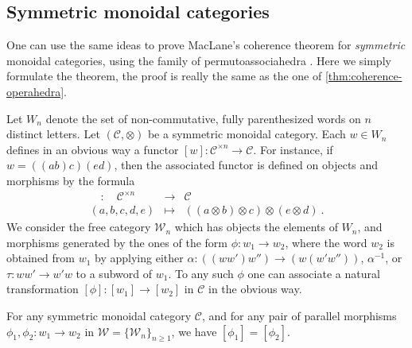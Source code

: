 


\subsection{Symmetric monoidal categories} 
One can use the same ideas to prove MacLane's coherence theorem for \emph{symmetric} monoidal categories, using the family of permutoassociahedra \cite{kapranov1993,reinerCoxeterassociahedra1994,baralicSimplePermutoassociahedron2019,CastilloLiu21}. 
Here we simply formulate the theorem, the proof is really the same as the one of \cref{thm:coherence-operahedra}.

Let $W_n$ denote the set of non-commutative, fully parenthesized words on $n$ distinct letters. 
Let $(\mathcal{C}, \otimes)$ be a symmetric monoidal category.
Each $w \in W_n$ defines in an obvious way a functor $[w] : \mathcal{C}^{\times n} \to \mathcal{C}$.
For instance, if $w=((ab)c)(ed)$, then the associated functor is defined on objects and morphisms by the formula
\begin{eqnarray*}
    [w] \quad : \quad \mathcal{C}^{\times n} & \to & \mathcal{C} \\
    (a,b,c,d,e) & \mapsto & ((a \otimes b) \otimes c)\otimes (e \otimes d) \ .
\end{eqnarray*}
We consider the free category $\mathcal{W}_n$ which has objects the elements of $W_n$, and morphisms generated by the ones of the form $\phi : w_1 \to w_2$, where the word $w_2$ is obtained from $w_1$ by applying either $\alpha : ((ww')w'') \to (w(w'w''))$, $\alpha^{-1}$, or $\tau : ww' \to w'w$ to a subword of $w_1$.
To any such $\phi$ one can associate a natural transformation $[\phi] : [w_1] \to [w_2]$ in $\mathcal{C}$ in the obvious way. 

\begin{thm}
    \label{thm:MacLanesym}
    For any symmetric monoidal category $\mathcal{C}$, and for any pair of parallel morphisms $\phi_1,\phi_2: w_1 \to w_2$ in $\mathcal{W}=\{\mathcal{W}_n\}_{n\geq 1}$, we have $[\phi_1]=[\phi_2]$.
\end{thm}







